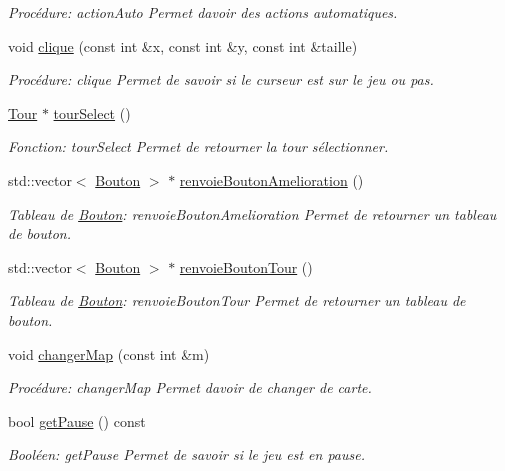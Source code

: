 \begin{DoxyCompactItemize}
\begin{DoxyCompactList}\small\item\em Procédure\+: action\+Auto Permet d\textquotesingle{}avoir des actions automatiques. \end{DoxyCompactList}\item 
void \hyperlink{classJeu_a6a95f56b4cdcf94806237e672de41d7f}{clique} (const int \&x, const int \&y, const int \&taille)
\begin{DoxyCompactList}\small\item\em Procédure\+: clique Permet de savoir si le curseur est sur le jeu ou pas. \end{DoxyCompactList}\item 
\hyperlink{classTour}{Tour} $\ast$ \hyperlink{classJeu_a495360d61991b02b3a5a702cef5bd4b2}{tour\+Select} ()
\begin{DoxyCompactList}\small\item\em Fonction\+: tour\+Select Permet de retourner la tour sélectionner. \end{DoxyCompactList}\item 
std\+::vector$<$ \hyperlink{classBouton}{Bouton} $>$ $\ast$ \hyperlink{classJeu_a09404fb1bfd86af39da4cb5945f22fa5}{renvoie\+Bouton\+Amelioration} ()
\begin{DoxyCompactList}\small\item\em Tableau de \hyperlink{classBouton}{Bouton}\+: renvoie\+Bouton\+Amelioration Permet de retourner un tableau de bouton. \end{DoxyCompactList}\item 
std\+::vector$<$ \hyperlink{classBouton}{Bouton} $>$ $\ast$ \hyperlink{classJeu_aea4394fb2f268e68eb8118d32286e8d7}{renvoie\+Bouton\+Tour} ()
\begin{DoxyCompactList}\small\item\em Tableau de \hyperlink{classBouton}{Bouton}\+: renvoie\+Bouton\+Tour Permet de retourner un tableau de bouton. \end{DoxyCompactList}\item 
void \hyperlink{classJeu_a87235796c5774f1e75a358a0b62602db}{changer\+Map} (const int \&m)
\begin{DoxyCompactList}\small\item\em Procédure\+: changer\+Map Permet d\textquotesingle{}avoir de changer de carte. \end{DoxyCompactList}\item 
bool \hyperlink{classJeu_af4cfcc4e37dc2365e657fadc8c046e95}{get\+Pause} () const
\begin{DoxyCompactList}\small\item\em Booléen\+: get\+Pause Permet de savoir si le jeu est en pause. \end{DoxyCompactList}\item 

\end{DoxyCompactItemize}
